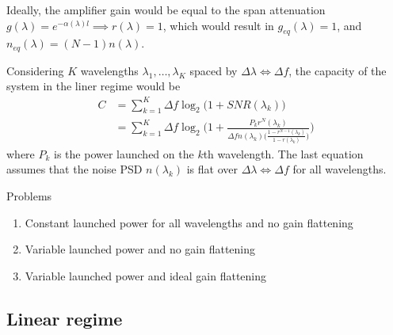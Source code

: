 \documentclass[a4paper]{article}
\begin{document}
Ideally, the amplifier gain would be equal to the span attenuation $g(\lambda) = e^{-\alpha(\lambda)l}\implies r(\lambda)=1$, which would result in $g_{eq}(\lambda) = 1$, and $n_{eq}(\lambda) = (N-1)n(\lambda)$.

Considering $K$ wavelengths $\lambda_1, \ldots, \lambda_{K}$ spaced by $\Delta\lambda\Longleftrightarrow\Delta f$, the capacity of the system in the liner regime would be
\begin{align}
	C &= \sum_{k = 1}^{K} \Delta f\log_2\Big(1 + SNR(\lambda_k)\Big)\\
	&= \sum_{k = 1}^{K} \Delta f\log_2\Bigg(1 + \frac{P_kr^N(\lambda_k)}{\Delta fn(\lambda_k)\Big(\frac{1-r^{N-1}(\lambda_k)}{1-r(\lambda_k)}\Big)}\Bigg)
\end{align}
where $P_k$ is the power launched on the $k$th wavelength. The last equation assumes that the noise PSD $n(\lambda_k)$ is flat over $\Delta\lambda\Longleftrightarrow\Delta f$ for all wavelengths.

Problems
\begin{enumerate}
	\item Constant launched power for all wavelengths and no gain flattening
	\item Variable launched power and no gain flattening	
	\item Variable launched power and ideal gain flattening
\end{enumerate}


\subsection{Linear regime}





\end{document}
